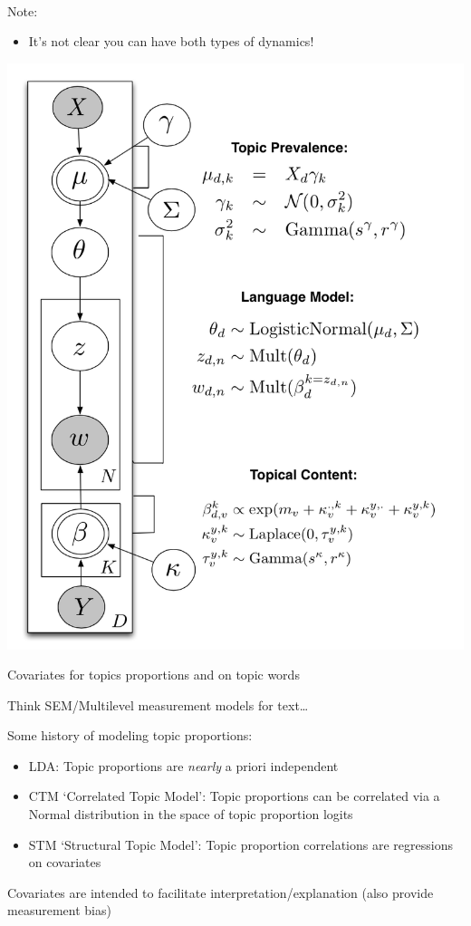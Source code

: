 \documentclass[11pt,compress,professionalfonts]{beamer}
\newcommand{\ita}{\begin{itemize}}
\newcommand{\itm}{\item[]}
\newcommand{\itz}{\end{itemize}}
\begin{document}
~\\
Note:
\ita
\itm It's not clear you can have both types of dynamics!
\itz


\centerline{\includegraphics[scale=.6]{pictures/stm-graphical-model}}

Covariates for topics proportions and on topic words


Think SEM/Multilevel measurement models for text\ldots  

Some history of modeling topic proportions:
\ita
\itm LDA: Topic proportions are \textit{nearly} a priori independent 
\itm CTM `Correlated Topic Model': Topic proportions can be correlated via a Normal distribution in the space of topic proportion logits
\itm STM `Structural Topic Model': Topic proportion correlations are regressions on covariates 
\itz

Covariates are intended to facilitate interpretation/explanation (also provide measurement bias)
\end{document}

